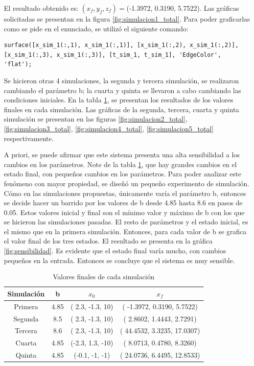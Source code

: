 \documentclass[12pt,letterpaper]{article}
\begin{document}
El resultado obtenido es: $(x_f, y_f, z_f)=$(-1.3972, 0.3190, 5.7522).
Las gráficas solicitadas se presentan en la figura \ref{fig:simulacion1_total}. Para poder graficarlas como se pide en el enunciado, se utilizó el siguiente comando:

\begin{lstlisting}[style=Matlab-editor, basicstyle=\mlttfamily]
    surface([x_sim_1(:,1), x_sim_1(:,1)], [x_sim_1(:,2), x_sim_1(:,2)], [x_sim_1(:,3), x_sim_1(:,3)], [t_sim_1, t_sim_1], 'EdgeColor', 'flat');
\end{lstlisting}

Se hicieron otras 4 simulaciones, la segunda y tercera simulación, se realizaron cambiando el parámetro b; la cuarta y quinta se llevaron a cabo cambiando las condiciones iniciales. En la tabla \ref{table:finales_ejercicio_1}, se presentan los resultados de los valores finales en cada simulación. Las gráficas de la segunda, tercera, cuarta y quinta simulación se presentan en las figuras \ref{fig:simulacion2_total}, \ref{fig:simulacion3_total}, \ref{fig:simulacion4_total}, \ref{fig:simulacion5_total} respectivamente. 

A priori, se puede afirmar que este sistema presenta una alta sensibilidad a los cambios en los parámetros. Note de la tabla \ref{table:finales_ejercicio_1}, que hay grandes cambios en el estado final, con pequeños cambios en los parámetros. Para poder analizar este fenómeno con mayor propiedad, se diseñó un pequeño experimento de simulación. Cómo en las simulaciones propuestas, únicamente varía el parámetro b, entonces se decide hacer un barrido por los valores de b desde 4.85 hasta 8.6 en pasos de 0.05. Estos valores inicial y final son el mínimo valor y máximo de b con los que se hicieron las simulaciones pasadas. El resto de parámetros y el estado inicial, es el mismo que en la primera simulación. Entonces, para cada valor de b se grafica el valor final de los tres estados. El resultado se presenta en la gráfica \ref{fig:sensibilidad}. Es evidente que el estado final varía mucho, con cambios pequeños en la entrada. Entonces se concluye que el sistema es muy sensible.


\begin{table}
\caption{Valores finales de cada simulación}
\label{table:finales_ejercicio_1}
\centering
\begin{tabular}{| c | c  c  c|}
  \hline
 Simulación & b   & $x_0$   & $x_f$   \\
 \hline
 Primera    & 4.85&( 2.3, -1.3,  10) &( -1.3972, 0.3190, 5.7522) \\
 Segunda    & 8.5& ( 2.3, -1.3,  10) &( 2.8602,  1.4443, 2.7291) \\
 Tercera    & 8.6& ( 2.3, -1.3,  10) &( 44.4532, 3.3235, 17.0307)\\
 Cuarta     & 4.85&(-2.3,  1.3, -10) &( 8.0713,  0.4780, 8.3260)\\
 Quinta     & 4.85&(-0.1, -1,    -1) &( 24.0736, 6.4495, 12.8533)\\
 \hline

\end{tabular}
\end{table}
\end{document}

